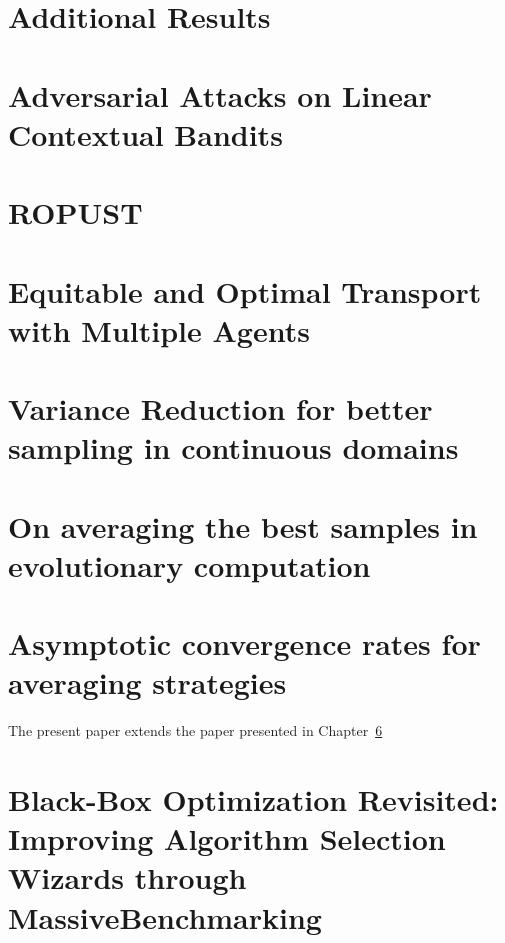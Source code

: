 \begin{appendices}
\chapter{Additional Results}
\minitoc


\chapter{Adversarial Attacks on Linear Contextual Bandits}
\label{paper:banditsattacks}




\chapter{ROPUST}
\label{paper:ropust}




\chapter{Equitable and Optimal Transport with Multiple Agents}
\label{paper:eot}




\chapter{Variance Reduction for better sampling in continuous domains}
\label{paper:rescaling}




\chapter{On averaging the best samples in evolutionary computation}
\label{paper:kbest}


\chapter{Asymptotic convergence rates for averaging strategies}
\label{paper:kbestgen}
The present paper extends the paper presented in Chapter~\ref{paper:kbest}


\chapter{Black-Box Optimization Revisited: Improving Algorithm Selection Wizards through MassiveBenchmarking}
\label{paper:benchmark}


\end{appendices}
